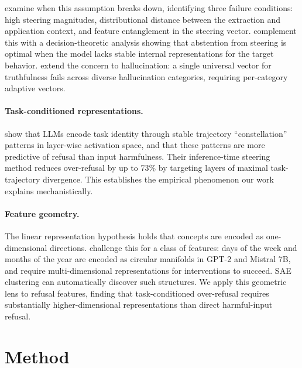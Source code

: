 \documentclass[11pt]{article}
\begin{document}
\citet{braun2025unreliability} examine when this assumption breaks down, identifying three failure conditions: high steering magnitudes, distributional distance between the extraction and application context, and feature entanglement in the steering vector. \citet{hedstrom2025steer} complement this with a decision-theoretic analysis showing that abstention from steering is optimal when the model lacks stable internal representations for the target behavior. \citet{wang2025adaptive} extend the concern to hallucination: a single universal vector for truthfulness fails across diverse hallucination categories, requiring per-category adaptive vectors.

\paragraph{Task-conditioned representations.}
\citet{safeconstellations2025} show that LLMs encode task identity through stable trajectory ``constellation'' patterns in layer-wise activation space, and that these patterns are more predictive of refusal than input harmfulness. Their inference-time steering method reduces over-refusal by up to 73\% by targeting layers of maximal task-trajectory divergence. This establishes the empirical phenomenon our work explains mechanistically.

\paragraph{Feature geometry.}
The linear representation hypothesis \citep{park2023linear,elhage2021mathematical} holds that concepts are encoded as one-dimensional directions. \citet{engels2025nonlinear} challenge this for a class of features: days of the week and months of the year are encoded as circular manifolds in GPT-2 and Mistral 7B, and require multi-dimensional representations for interventions to succeed. SAE clustering can automatically discover such structures. We apply this geometric lens to refusal features, finding that task-conditioned over-refusal requires substantially higher-dimensional representations than direct harmful-input refusal.

\section{Method}
\label{sec:method}
\end{document}

